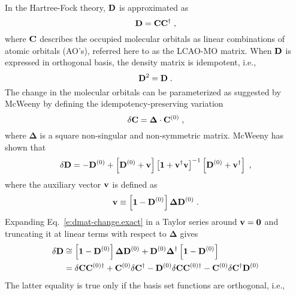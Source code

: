 \documentclass[aip,graphicx]{revtex4-1}
\newcommand{\BM}[1]{\bm{#1}}
\begin{document}
In the Hartree\hyp{}Fock theory, ${\bf D}$ is approximated as
%
\begin{equation}
 {\bf D} = {\bf C}{\bf C}^\dagger \;,
\end{equation}
%
where ${\bf C}$ describes the occupied molecular orbitals as linear combinations
of atomic orbitals (AO's), referred here to as the LCAO-MO matrix.
When ${\bf D}$ is expressed in orthogonal basis, the density matrix is idempotent, i.e.,
%
\begin{equation}
 {\bf D}^2 = {\bf D} \;.
\end{equation}
%
The change in the molecular orbitals can be parameterized as suggested by McWeeny\cite{McWeeny.RevModPhys.1960}
by defining the idempotency\hyp{}preserving variation
%
\begin{equation}
 \delta {\bf C} = {\BM\Delta} \cdot {\bf C}^{(0)} \;,
\end{equation}
%
where $\BM\Delta$ is a square non\hyp{}singular and non\hyp{}symmetric matrix.
McWeeny has shown that
%
\begin{equation} \label{e:dmat-change.exact}
 \delta {\bf D} = -{\bf D}^{(0)} + \left[ {\bf D}^{(0)} + {\bf v} \right]
                                   \left[ {\bf 1} + {\bf v}^\dagger{\bf v} \right]^{-1}
                                   \left[ {\bf D}^{(0)} + {\bf v}^\dagger \right] \;,
\end{equation}
%
where the auxiliary vector ${\bf v}$ is defined as
%
\begin{equation}
 {\bf v} \equiv \left[ {\bf 1} - {\bf D}^{(0)} \right] {\BM\Delta} {\bf D}^{(0)}  \;.
\end{equation}
%
Expanding Eq.~\eqref{e:dmat-change.exact} in a Taylor series around ${\bf v}={\bf 0}$ and
truncating it at linear terms with respect to ${\BM\Delta}$ gives
%
\begin{subequations} 
 \begin{align}
 \delta {\bf D} &\cong \left[ {\bf 1} - {\bf D}^{(0)} \right] {\BM\Delta} {\bf D}^{(0)} + 
                        {\bf D}^{(0)} {\BM\Delta}^\dagger \left[ {\bf 1} - {\bf D}^{(0)} \right]  
 \label{e:dD-1} \\  &= 
  \delta {\bf C}  {\bf C}^{(0)\dagger} + {\bf C}^{(0)}\delta {\bf C}^\dagger
           - {\bf D}^{(0)} \delta {\bf C}  {\bf C}^{{(0)}\dagger} - {\bf C}^{(0)}\delta {\bf C}^\dagger {\bf D}^{(0)} 
 \label{e:dD-2}
 \end{align}
\end{subequations}
%
The latter equality is true only if the basis set functions are orthogonal, i.e., 
\end{document}
